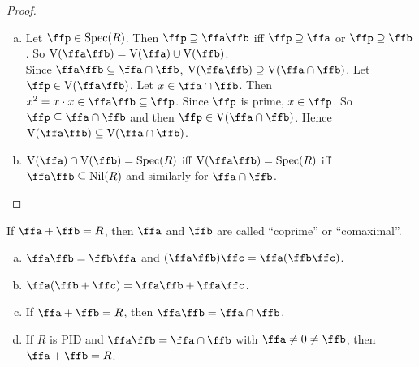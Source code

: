 \begin{proof}
    \begin{enumerate}[(a)]
        \item Let $\ffp \in \operatorname{Spec}(R)$. Then $\ffp \supseteq \ffa \ffb$ iff $\ffp \supseteq \ffa$ or $\ffp \supseteq \ffb$. So $\operatorname{V}(\ffa \ffb) = \operatorname{V}(\ffa) \cup \operatorname{V}(\ffb)$. \\
            Since $\ffa \ffb \subseteq \ffa \cap \ffb$, $\operatorname{V}(\ffa \ffb) \supseteq \operatorname{V}(\ffa \cap \ffb)$. Let $\ffp \in \operatorname{V}(\ffa \ffb)$. Let $x \in \ffa \cap \ffb$. Then $x^2 = x \cdot x \in \ffa \ffb \subseteq \ffp$. Since $\ffp$ is prime, $x \in \ffp$. So $\ffp \subseteq \ffa \cap \ffb$ and then $\ffp \in \operatorname{V}(\ffa \cap \ffb)$. Hence $\operatorname{V}(\ffa \ffb) \subseteq \operatorname{V}(\ffa \cap \ffb)$.
        \item $\operatorname{V}(\ffa) \cap \operatorname{V}(\ffb) = \operatorname{Spec}(R)$ iff $\operatorname{V}(\ffa \ffb) = \operatorname{Spec}(R)$ iff $\ffa\ffb \subseteq \operatorname{Nil}(R)$ and similarly for $\ffa \cap \ffb$.
    \end{enumerate}
\end{proof}

\begin{definition}
    If $\ffa + \ffb = R$, then $\ffa$ and $\ffb$ are called ``coprime'' or ``comaximal''.
\end{definition}

\begin{proposition}
    \begin{enumerate}[(a)]
        \item $\ffa \ffb = \ffb \ffa$ and $(\ffa \ffb)\ffc = \ffa(\ffb\ffc)$.
        \item $\ffa(\ffb + \ffc) = \ffa \ffb + \ffa \ffc$.
        \item If $\ffa + \ffb = R$, then $\ffa \ffb = \ffa \cap \ffb$.
        \item If $R$ is PID and $\ffa \ffb = \ffa \cap \ffb$ with $\ffa \neq 0 \neq \ffb$, then $\ffa + \ffb = R$.
    \end{enumerate}
\end{proposition}

